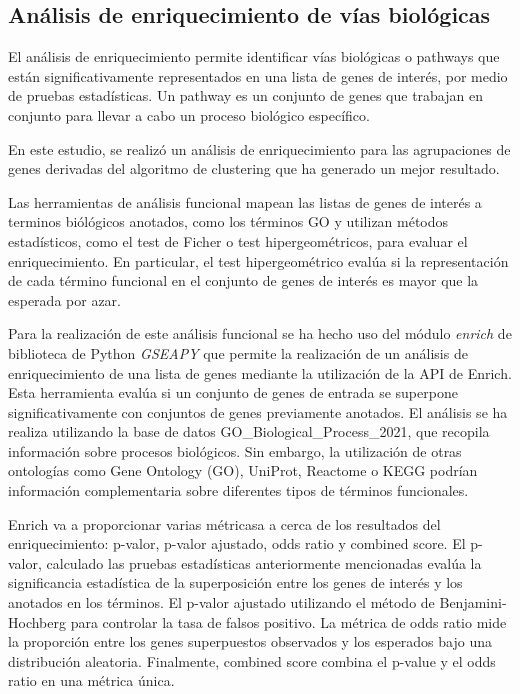\subsection{Análisis de enriquecimiento de vías biológicas}

El análisis de enriquecimiento permite identificar vías biológicas o pathways que están significativamente representados en una lista de genes de interés, por medio de pruebas estadísticas. Un pathway es un conjunto de genes que trabajan en conjunto para llevar a cabo un proceso biológico específico.\cite{Reimand2019}

En este estudio, se realizó un análisis de enriquecimiento para las agrupaciones de genes derivadas del algoritmo de clustering que ha generado un mejor resultado.

Las herramientas de análisis funcional mapean las listas de genes de interés a terminos biólógicos anotados, como los términos GO y utilizan métodos estadísticos, como el test de Ficher o test hipergeométricos,
para evaluar el enriquecimiento.\cite{10.1093/nar/gkn923} En particular, el test hipergeométrico evalúa si la representación de cada término funcional en el conjunto de genes de interés 
es mayor que la esperada por azar. 


Para la realización de este análisis funcional se ha hecho uso del módulo \textit{enrich} de biblioteca de Python \textit{GSEAPY} que permite la realización de un 
análisis de enriquecimiento de una lista de genes mediante la utilización de la API de Enrich. Esta herramienta evalúa si un conjunto de genes de entrada se superpone significativamente con conjuntos de genes previamente anotados. 
El análisis se ha realiza utilizando la base de datos  GO_Biological_Process_2021, que recopila información sobre procesos biológicos. Sin embargo, la utilización de otras ontologías como 
Gene Ontology (GO), UniProt, Reactome o KEGG podrían  información complementaria sobre diferentes tipos de términos funcionales.

Enrich va a proporcionar varias métricasa a cerca de los resultados del enriquecimiento: p-valor, p-valor ajustado, odds ratio y combined score.
El p-valor, calculado las pruebas estadísticas anteriormente mencionadas evalúa la significancia estadística de la superposición entre los genes de interés y los anotados en los términos. El p-valor ajustado
utilizando el método de Benjamini-Hochberg para controlar la tasa de falsos positivo. La métrica de odds ratio mide la proporción entre los genes superpuestos observados y los esperados bajo una distribución aleatoria.
Finalmente, combined score combina el p-value y el odds ratio en una métrica única. \cite{maayanlab_enrichr_help}

